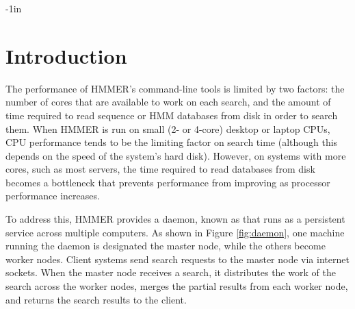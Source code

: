 \documentclass[notoc,justified]{tufte-book}    %
\begin{document}
\setcounter{tocdepth}{2}             %

\maketitle



\begin{adjustwidth}{}{-1in}          %
\tableofcontents                     
\end{adjustwidth}


\chapter{Introduction}

The performance of HMMER's command-line tools is limited by two factors: the number of cores that are available to work on each search, and the amount of time required to read sequence or HMM databases from disk in order to search them.  When HMMER is run on small (2- or 4-core) desktop or laptop CPUs, CPU performance tends to be the limiting factor on search time (although this depends on the speed of the system's hard disk).  However, on systems with more cores, such as most servers, the time required to read databases from disk becomes a bottleneck that prevents performance from improving as processor performance increases.

To address this, HMMER provides a  daemon, known as   that runs as a persistent service across multiple computers.  As shown in Figure \ref{fig:daemon}, one machine running the daemon is designated the master node, while the others become worker nodes.  Client systems send search requests to the master node via internet sockets.  When the master node receives a search, it distributes the work of the search across the worker nodes, merges the partial results from each worker node, and returns the search results to the client.
\end{document}
